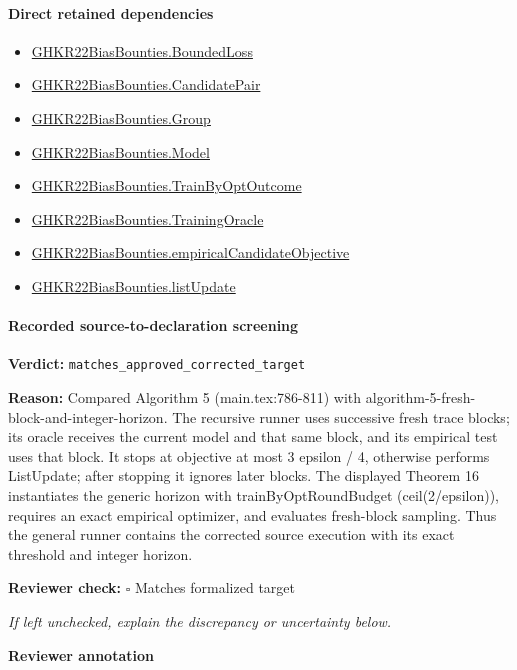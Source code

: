 \documentclass[10pt]{article}
\newcommand{\reviewerbox}{%
  \par\noindent\fbox{\parbox{0.96\linewidth}{\rule{0pt}{0.38in}}}\par
}
\newcommand{\reviewmatch}[1]{%
  \par\noindent\textbf{Reviewer check:} $\square$\; #1\par
  \noindent\emph{If left unchecked, explain the discrepancy or uncertainty below.}\par
}
\begin{document}
\paragraph{Direct retained dependencies}
\begin{itemize}\raggedright
\item \hyperlink{paper-prerequisite-ef6c319b0770dad4}{GHKR22\allowbreak{}Bias\allowbreak{}Bounties.\allowbreak{}Bounded\allowbreak{}Loss}
\item \hyperlink{governing-declaration-373b79d2a57e81fc}{GHKR22\allowbreak{}Bias\allowbreak{}Bounties.\allowbreak{}Candidate\allowbreak{}Pair}
\item \hyperlink{paper-prerequisite-cc7214115b27106f}{GHKR22\allowbreak{}Bias\allowbreak{}Bounties.\allowbreak{}Group}
\item \hyperlink{paper-prerequisite-333127605c12eba8}{GHKR22\allowbreak{}Bias\allowbreak{}Bounties.\allowbreak{}Model}
\item \hyperlink{governing-declaration-271b294237df7f70}{GHKR22\allowbreak{}Bias\allowbreak{}Bounties.\allowbreak{}Train\allowbreak{}By\allowbreak{}Opt\allowbreak{}Outcome}
\item \hyperlink{governing-declaration-e07f2849e71306e6}{GHKR22\allowbreak{}Bias\allowbreak{}Bounties.\allowbreak{}Training\allowbreak{}Oracle}
\item \hyperlink{governing-declaration-dc9f873a9d9fc764}{GHKR22\allowbreak{}Bias\allowbreak{}Bounties.\allowbreak{}empirical\allowbreak{}Candidate\allowbreak{}Objective}
\item \hyperlink{paper-prerequisite-6c3f0056117b6991}{GHKR22\allowbreak{}Bias\allowbreak{}Bounties.\allowbreak{}list\allowbreak{}Update}
\end{itemize}
\paragraph{Recorded source-to-declaration screening}
\textbf{Verdict:} \texttt{matches\_approved\_corrected\_target}
\\
{\raggedright
\textbf{Reason:} Compared Algorithm 5 (main.\allowbreak{}tex:\allowbreak{}786-\allowbreak{}811) with algorithm-\allowbreak{}5-\allowbreak{}fresh-\allowbreak{}block-\allowbreak{}and-\allowbreak{}integer-\allowbreak{}horizon.\allowbreak{} The recursive runner uses successive fresh trace blocks;\allowbreak{} its oracle receives the current model and that same block, and its empirical test uses that block.\allowbreak{} It stops at objective at most 3 epsilon /\allowbreak{} 4, otherwise performs ListUpdate;\allowbreak{} after stopping it ignores later blocks.\allowbreak{} The displayed Theorem 16 instantiates the generic horizon with trainByOptRoundBudget (ceil(2/\allowbreak{}epsilon)), requires an exact empirical optimizer, and evaluates fresh-\allowbreak{}block sampling.\allowbreak{} Thus the general runner contains the corrected source execution with its exact threshold and integer horizon.\allowbreak{}
\par}
\reviewmatch{Matches formalized target}
\noindent\textbf{Reviewer annotation}\par
\reviewerbox
\end{document}
